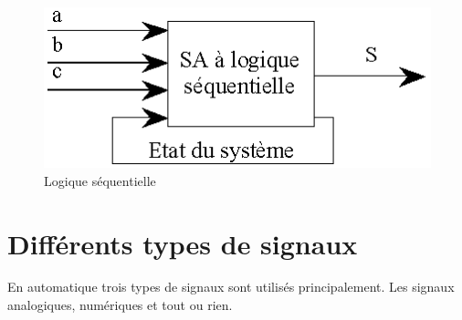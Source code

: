 \documentclass[10pt,fleqn]{article} %
\begin{document}
\begin{figure}[h]
  \centering
  \includegraphics[width=.4\textwidth]{images/sequentiel}
  \caption{Logique séquentielle}
  \label{fig:combinatoire}
\end{figure}



\section{Différents types de signaux}
En automatique trois types de signaux sont utilisés principalement. Les signaux analogiques, numériques et tout ou rien.
\end{document}

